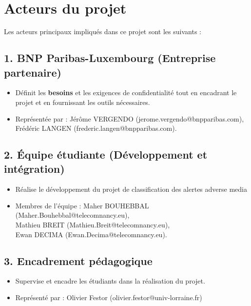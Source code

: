 \section{Acteurs du projet}

Les acteurs principaux impliqués dans ce projet sont les suivants :

\subsection*{1. BNP Paribas-Luxembourg (Entreprise partenaire)}
\begin{itemize}[left=0pt]
    \item Définit les \textbf{besoins} et les exigences de confidentialité tout en encadrant le projet et en fournissant les outils nécessaires.
    \item Représentée par : Jérôme VERGENDO (jerome.vergendo@bnpparibas.com), Frédéric LANGEN (frederic.langen@bnpparibas.com).
\end{itemize}

\subsection*{2. Équipe étudiante (Développement et intégration)}
\begin{itemize}[left=0pt]
    \item Réalise le développement du projet de classification des alertes adverse media
   \item Membres de l'équipe : 
Maher BOUHEBBAL (Maher.Bouhebbal@telecomnancy.eu),\\
Mathieu BREIT (Mathieu.Breit@telecomnancy.eu),\\
Ewan DECIMA (Ewan.Decima@telecomnancy.eu).

\end{itemize}

\subsection*{3. Encadrement pédagogique }
\begin{itemize}[left=0pt]
    \item Supervise et encadre les étudiants dans la réalisation du projet.
    \item Représenté par : Olivier Festor (olivier.festor@univ-lorraine.fr)
\end{itemize}
